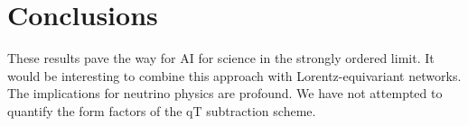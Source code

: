 \section{Conclusions}\label{sec:conclusions}

These results pave the way for AI for science in the strongly ordered
limit. It would be interesting to combine this approach with
Lorentz-equivariant networks. The implications for neutrino physics are
profound. We have not attempted to quantify the form factors of the qT
subtraction scheme.

